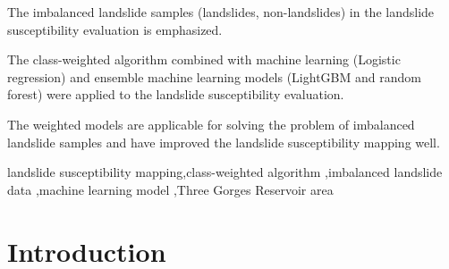 \documentclass[a4paper,fleqn]{cas-sc}
\begin{document}
 
\begin{highlights}
\item The imbalanced landslide samples (landslides, non-landslides) in the landslide susceptibility evaluation is emphasized.
\item The class-weighted algorithm combined with machine learning (Logistic regression) and ensemble machine learning models (LightGBM and random forest) were applied to the landslide susceptibility evaluation.
\item The weighted models are applicable for solving the problem of imbalanced landslide samples and have improved the landslide susceptibility mapping well.
\end{highlights}

\begin{keywords}
landslide susceptibility mapping\sep class-weighted algorithm \sep imbalanced landslide data \sep machine learning model \sep Three Gorges Reservoir area
\end{keywords}

\maketitle 

\printcredits

\doublespacing


\section{Introduction}
\end{document}

